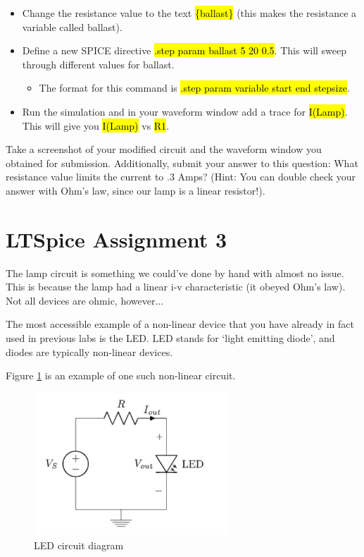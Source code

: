\documentclass{article}
\begin{document}
\begin{itemize}
  \item Change the resistance value to the text \hl{\{ballast\}} (this makes the resistance a variable called ballast).
  \item Define a new SPICE directive \hl{.step param ballast 5 20 0.5}. This will sweep through different values for ballast.
    \begin{itemize}
      \item The format for this command is \hl{.step param variable start end stepsize}.
    \end{itemize}
  \item Run the simulation and in your waveform window add a trace for \hl{I(Lamp)}. This will give you \hl{I(Lamp)} vs \hl{R1}.
\end{itemize}

Take a screenshot of your modified circuit and the waveform window you obtained for submission. Additionally, submit your answer to this question: What resistance value limits the current to .3 Amps? (Hint: You can double check your answer with Ohm's law, since our lamp is a linear resistor!).

\section*{LTSpice Assignment 3}
The lamp circuit is something we could've done by hand with almost no issue. This is because the lamp had a linear i-v characteristic (it obeyed Ohm's law). Not all devices are ohmic, however...

The most accessible example of a non-linear device that you have already in fact used in previous labs is the LED. LED stands for `light emitting diode', and diodes are typically non-linear devices.

Figure \ref{fig:assignment3} is an example of one such non-linear circuit.

\begin{figure}[h]
\centering
\includegraphics[width=0.65\textwidth]{lab1_fig-15}
\caption{LED circuit diagram}
\label{fig:assignment3}
\end{figure}
\end{document}
